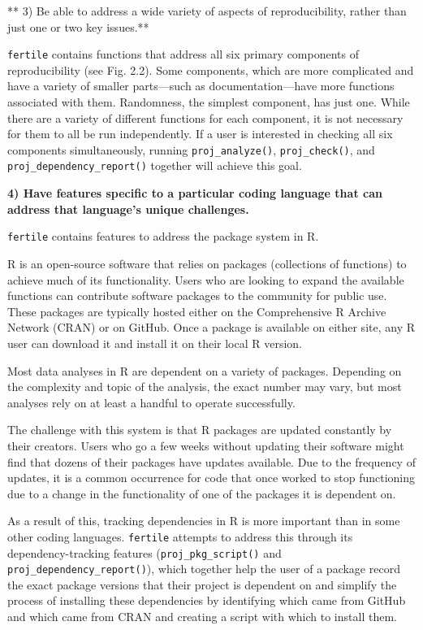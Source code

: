 \documentclass[12pt,twoside]{reedthesis}
\begin{document}
** 3) Be able to address a wide variety of aspects of reproducibility, rather than just one or two key issues.**

\texttt{fertile} contains functions that address all six primary components of reproducibility (see Fig. 2.2). Some components, which are more complicated and have a variety of smaller parts---such as documentation---have more functions associated with them. Randomness, the simplest component, has just one. While there are a variety of different functions for each component, it is not necessary for them to all be run independently. If a user is interested in checking all six components simultaneously, running \texttt{proj\_analyze()}, \texttt{proj\_check()}, and \texttt{proj\_dependency\_report()} together will achieve this goal.

\textbf{4) Have features specific to a particular coding language that can address that language's unique challenges.}

\texttt{fertile} contains features to address the package system in R.

R is an open-source software that relies on packages (collections of functions) to achieve much of its functionality. Users who are looking to expand the available functions can contribute software packages to the community for public use. These packages are typically hosted either on the Comprehensive R Archive Network (CRAN) or on GitHub. Once a package is available on either site, any R user can download it and install it on their local R version.

Most data analyses in R are dependent on a variety of packages. Depending on the complexity and topic of the analysis, the exact number may vary, but most analyses rely on at least a handful to operate successfully.

The challenge with this system is that R packages are updated constantly by their creators. Users who go a few weeks without updating their software might find that dozens of their packages have updates available. Due to the frequency of updates, it is a common occurrence for code that once worked to stop functioning due to a change in the functionality of one of the packages it is dependent on.

As a result of this, tracking dependencies in R is more important than in some other coding languages. \texttt{fertile} attempts to address this through its dependency-tracking features (\texttt{proj\_pkg\_script()} and \texttt{proj\_dependency\_report()}), which together help the user of a package record the exact package versions that their project is dependent on and simplify the process of installing these dependencies by identifying which came from GitHub and which came from CRAN and creating a script with which to install them.
\end{document}
